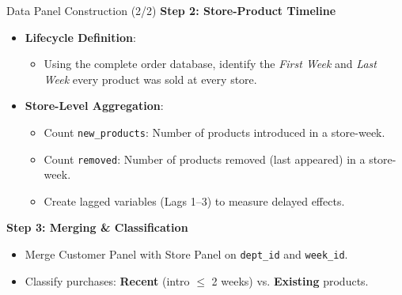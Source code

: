 \documentclass[aspectratio=169]{beamer}  %
\begin{document}
\begin{frame}{Data Panel Construction (2/2)}
    \textbf{Step 2: Store-Product Timeline}
    \begin{itemize}
        \item \textbf{Lifecycle Definition}:
        \begin{itemize}
            \item Using the complete order database, identify the \textit{First Week} and \textit{Last Week} every product was sold at every store.
        \end{itemize}
        \item \textbf{Store-Level Aggregation}:
        \begin{itemize}
            \item Count \texttt{new\_products}: Number of products introduced in a store-week.
            \item Count \texttt{removed}: Number of products removed (last appeared) in a store-week.
            \item Create lagged variables (Lags 1--3) to measure delayed effects.
        \end{itemize}
    \end{itemize}
    \vspace{0.2cm}
    \textbf{Step 3: Merging \& Classification}
    \begin{itemize}
        \item Merge Customer Panel with Store Panel on \texttt{dept\_id} and \texttt{week\_id}.
        \item Classify purchases: \textbf{Recent} (intro $\le$ 2 weeks) vs. \textbf{Existing} products.
    \end{itemize}
\end{frame}
\end{document}
